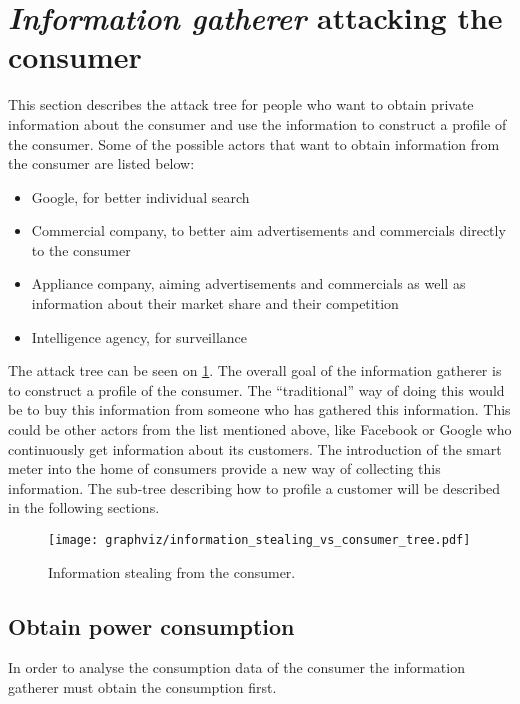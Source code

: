 \section{\emph{Information gatherer} attacking the consumer}
This section describes the attack tree for people who want to obtain private information about the consumer and use the information to construct a profile of the consumer.
Some of the possible actors that want to obtain information from the consumer are listed below:
\begin{itemize}
\item Google, for better individual search
\item Commercial company, to better aim advertisements and commercials directly to the consumer
\item Appliance company, aiming advertisements and commercials as well as information about their market share and their competition
\item Intelligence agency, for surveillance
\end{itemize}

The attack tree can be seen on \cref{information_stealing_tree}.
The overall goal of the information gatherer is to construct a profile of the consumer.
The ``traditional'' way of doing this would be to buy this information from someone who has gathered this information.
This could be other actors from the list mentioned above, like Facebook or Google who continuously get information about its customers.
The introduction of the smart meter into the home of consumers provide a new way of collecting this information.
The sub-tree describing how to profile a customer will be described in the following sections.


\begin{figure}
  \begin{center}
    \texttt{[image: graphviz/information\_stealing\_vs\_consumer\_tree.pdf]}
  \end{center}
  \caption{Information stealing from the consumer.}
  \label{information_stealing_tree}
\end{figure}

\subsection{Obtain power consumption}
In order to analyse the consumption data of the consumer the information gatherer must obtain the consumption first.

